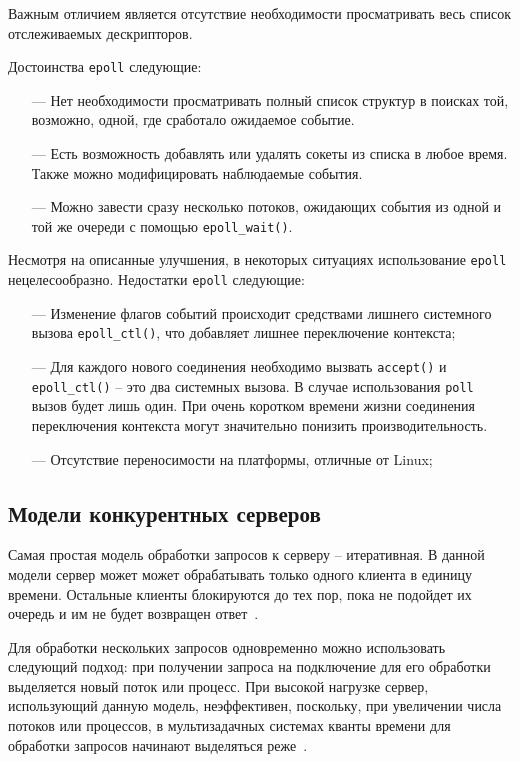 Важным отличием является отсутствие необходимости просматривать весь список отслеживаемых дескрипторов.

Достоинства \texttt{epoll} следующие:
\begin{itemize}
	\item[---] Нет необходимости просматривать полный список структур в поисках той, возможно, одной, где сработало ожидаемое событие.
	
	\item[---] Есть возможность добавлять или удалять сокеты из списка в любое время. Также можно модифицировать наблюдаемые события.
	
	\item[---] Можно завести сразу несколько потоков, ожидающих события из одной и той же очереди с помощью \texttt{epoll\_wait()}.
\end{itemize}

Несмотря на описанные улучшения, в некоторых ситуациях использование \texttt{epoll} нецелесообразно. Недостатки \texttt{epoll} следующие:

\begin{itemize}
	\item[---] Изменение флагов событий происходит средствами лишнего системного вызова \texttt{epoll\_ctl()}, что добавляет лишнее переключение контекста;
	
	\item[---] Для каждого нового соединения необходимо вызвать \texttt{accept()} и \\\texttt{epoll\_ctl()} -- это два системных вызова. В случае использования \texttt{poll} вызов будет лишь один. При очень коротком времени жизни соединения переключения контекста могут значительно понизить производительность.
	
	\item[---] Отсутствие переносимости на платформы, отличные от Linux;
\end{itemize}

\subsection{Модели конкурентных серверов}

Самая простая модель обработки запросов к серверу -- итеративная. В данной модели сервер может может обрабатывать только одного клиента в единицу времени. Остальные клиенты блокируются до тех пор, пока не подойдет их очередь и им не будет возвращен ответ~\cite{Tiwari2012ASP}.

Для обработки нескольких запросов одновременно можно использовать следующий подход: при получении запроса на подключение для его обработки выделяется новый поток или процесс. При высокой нагрузке сервер, использующий данную модель, неэффективен, поскольку, при увеличении числа потоков или процессов, в мультизадачных системах кванты времени для обработки запросов начинают выделяться реже~\cite{Tiwari2012ASP}.

